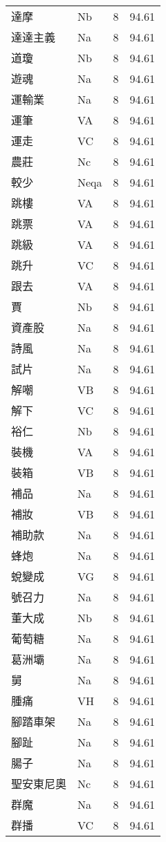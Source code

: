 \documentclass[twocolumn]{book}
\begin{document}
\begin{supertabular}{llrr}
達摩 & Nb & 8 &  94.61\\
達達主義 & Na & 8 &  94.61\\
道瓊 & Nb & 8 &  94.61\\
遊魂 & Na & 8 &  94.61\\
運輸業 & Na & 8 &  94.61\\
運筆 & VA & 8 &  94.61\\
運走 & VC & 8 &  94.61\\
農莊 & Nc & 8 &  94.61\\
較少 & Neqa & 8 &  94.61\\
跳樓 & VA & 8 &  94.61\\
跳票 & VA & 8 &  94.61\\
跳級 & VA & 8 &  94.61\\
跳升 & VC & 8 &  94.61\\
跟去 & VA & 8 &  94.61\\
賈 & Nb & 8 &  94.61\\
資產股 & Na & 8 &  94.61\\
詩風 & Na & 8 &  94.61\\
試片 & Na & 8 &  94.61\\
解嘲 & VB & 8 &  94.61\\
解下 & VC & 8 &  94.61\\
裕仁 & Nb & 8 &  94.61\\
裝機 & VA & 8 &  94.61\\
裝箱 & VB & 8 &  94.61\\
補品 & Na & 8 &  94.61\\
補妝 & VB & 8 &  94.61\\
補助款 & Na & 8 &  94.61\\
蜂炮 & Na & 8 &  94.61\\
蛻變成 & VG & 8 &  94.61\\
號召力 & Na & 8 &  94.61\\
董大成 & Nb & 8 &  94.61\\
葡萄糖 & Na & 8 &  94.61\\
葛洲壩 & Na & 8 &  94.61\\
舅 & Na & 8 &  94.61\\
腫痛 & VH & 8 &  94.61\\
腳踏車架 & Na & 8 &  94.61\\
腳趾 & Na & 8 &  94.61\\
腸子 & Na & 8 &  94.61\\
聖安東尼奧 & Nc & 8 &  94.61\\
群魔 & Na & 8 &  94.61\\
群播 & VC & 8 &  94.61\\

\end{supertabular}
\end{document}
